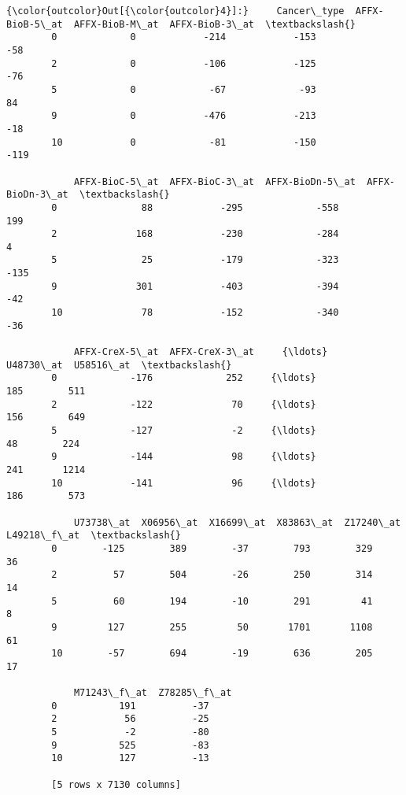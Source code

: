 \documentclass[11pt]{article}
\begin{document}
\begin{Verbatim}[commandchars=\\\{\}]
{\color{outcolor}Out[{\color{outcolor}4}]:}     Cancer\_type  AFFX-BioB-5\_at  AFFX-BioB-M\_at  AFFX-BioB-3\_at  \textbackslash{}
        0             0            -214            -153             -58   
        2             0            -106            -125             -76   
        5             0             -67             -93              84   
        9             0            -476            -213             -18   
        10            0             -81            -150            -119   
        
            AFFX-BioC-5\_at  AFFX-BioC-3\_at  AFFX-BioDn-5\_at  AFFX-BioDn-3\_at  \textbackslash{}
        0               88            -295             -558              199   
        2              168            -230             -284                4   
        5               25            -179             -323             -135   
        9              301            -403             -394              -42   
        10              78            -152             -340              -36   
        
            AFFX-CreX-5\_at  AFFX-CreX-3\_at     {\ldots}       U48730\_at  U58516\_at  \textbackslash{}
        0             -176             252     {\ldots}             185        511   
        2             -122              70     {\ldots}             156        649   
        5             -127              -2     {\ldots}              48        224   
        9             -144              98     {\ldots}             241       1214   
        10            -141              96     {\ldots}             186        573   
        
            U73738\_at  X06956\_at  X16699\_at  X83863\_at  Z17240\_at  L49218\_f\_at  \textbackslash{}
        0        -125        389        -37        793        329           36   
        2          57        504        -26        250        314           14   
        5          60        194        -10        291         41            8   
        9         127        255         50       1701       1108           61   
        10        -57        694        -19        636        205           17   
        
            M71243\_f\_at  Z78285\_f\_at  
        0           191          -37  
        2            56          -25  
        5            -2          -80  
        9           525          -83  
        10          127          -13  
        
        [5 rows x 7130 columns]
\end{Verbatim}
            
\end{document}
